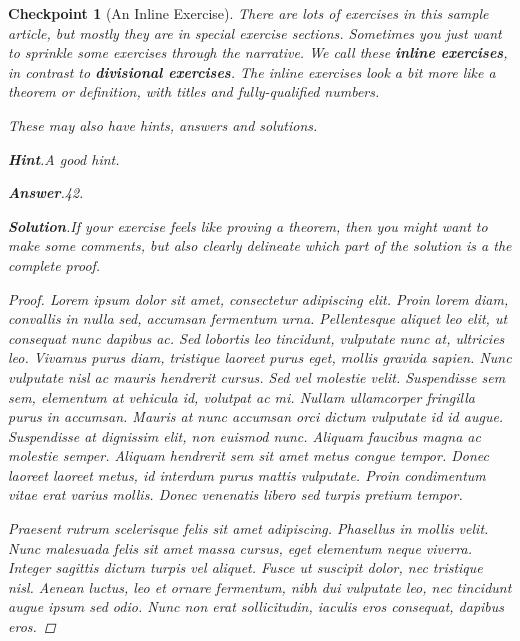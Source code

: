 \documentclass{sn-jnl}
\theoremstyle{thmstyleone}%
\theoremstyle{thmstyletwo}%
\newtheorem{inlineexercise}[theorem]{Checkpoint}
\theoremstyle{thmstylethree}%
\newcommand{\blocktitlefont}{\relax}
\newcommand{\terminology}[1]{\textbf{#1}}
\numberwithin{equation}{section}
\begin{document}
\begin{inlineexercise}[An Inline Exercise]\label{inline-exercise}%
%
There are lots of exercises in this sample article, but mostly they are in special exercise sections.  Sometimes you just want to sprinkle some exercises through the narrative.  We call these \terminology{inline exercises}, in contrast to \terminology{divisional exercises}.  The inline exercises look a bit more like a theorem or definition, with titles and fully-qualified numbers.%
\par
These may also have hints, answers and solutions.%
\par\smallskip%
\noindent\textbf{\blocktitlefont Hint}.\hypertarget{inline-exercise-3}{}\quad{}A good hint.%
\par\smallskip%
\noindent\textbf{\blocktitlefont Answer}.\hypertarget{inline-exercise-4}{}\quad{}42.%
\par\smallskip%
\noindent\textbf{\blocktitlefont Solution}.\hypertarget{inline-exercise-5}{}\quad{}If your exercise feels like proving a theorem, then you might want to make some comments, but also clearly delineate which part of the solution is a the complete proof.%
\begin{proof}\label{inline-exercise-5-2}%
Lorem ipsum dolor sit amet, consectetur adipiscing elit. Proin lorem diam, convallis in nulla sed, accumsan fermentum urna. Pellentesque aliquet leo elit, ut consequat nunc dapibus ac. Sed lobortis leo tincidunt, vulputate nunc at, ultricies leo. Vivamus purus diam, tristique laoreet purus eget, mollis gravida sapien. Nunc vulputate nisl ac mauris hendrerit cursus. Sed vel molestie velit. Suspendisse sem sem, elementum at vehicula id, volutpat ac mi. Nullam ullamcorper fringilla purus in accumsan. Mauris at nunc accumsan orci dictum vulputate id id augue. Suspendisse at dignissim elit, non euismod nunc. Aliquam faucibus magna ac molestie semper. Aliquam hendrerit sem sit amet metus congue tempor. Donec laoreet laoreet metus, id interdum purus mattis vulputate. Proin condimentum vitae erat varius mollis. Donec venenatis libero sed turpis pretium tempor.%
\par
Praesent rutrum scelerisque felis sit amet adipiscing. Phasellus in mollis velit. Nunc malesuada felis sit amet massa cursus, eget elementum neque viverra. Integer sagittis dictum turpis vel aliquet. Fusce ut suscipit dolor, nec tristique nisl. Aenean luctus, leo et ornare fermentum, nibh dui vulputate leo, nec tincidunt augue ipsum sed odio. Nunc non erat sollicitudin, iaculis eros consequat, dapibus eros.%
\end{proof}
\end{inlineexercise}%
\end{document}
